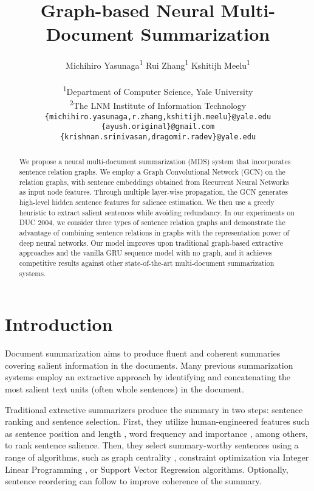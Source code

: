 \documentclass[11pt,a4paper]{article}
\title{Graph-based Neural Multi-Document Summarization}
\author{
	    Michihiro Yasunaga\textsuperscript{1} \quad Rui Zhang\textsuperscript{1} \quad Kshitijh Meelu\textsuperscript{1} \\ \quad {\bf Ayush Pareek\textsuperscript{2}} \quad {\bf Krishnan Srinivasan\textsuperscript{1}} \quad {\bf Dragomir Radev\textsuperscript{1}}\\
  	    \textsuperscript{1}Department of Computer Science, Yale University\\
  	    \textsuperscript{2}The LNM Institute of Information Technology\\
        {\small {\tt \{michihiro.yasunaga,r.zhang,kshitijh.meelu\}@yale.edu}}\\[-1mm]
        {\small{\tt \{ayush.original\}@gmail.com}}\\[-1mm]
        {\small{\tt \{krishnan.srinivasan,dragomir.radev\}@yale.edu}}
}
\date{}
\begin{document}
\setlength{\abovedisplayskip}{6pt}
\setlength{\belowdisplayskip}{5pt}
        
\maketitle
\begin{abstract}
We propose a neural multi-document summarization (MDS) system that incorporates sentence relation graphs.
We employ a Graph Convolutional Network (GCN) on the relation graphs, with sentence embeddings obtained from Recurrent Neural Networks as input node features.
Through multiple layer-wise propagation, the GCN generates high-level hidden sentence features for salience estimation.
We then use a greedy heuristic to extract salient sentences while avoiding redundancy.
In our experiments on DUC 2004, we consider three types of sentence relation graphs and demonstrate the advantage of combining sentence relations in graphs with the representation power of deep neural networks.
Our model improves upon traditional graph-based extractive approaches and the vanilla GRU sequence model with no graph, and it achieves competitive results against other state-of-the-art multi-document summarization systems.
\end{abstract}

\section{Introduction}
Document summarization aims to produce fluent and coherent summaries covering salient information in the documents.
Many previous summarization systems employ an extractive approach by identifying and concatenating the most salient text units (often whole sentences) in the document. 
  
Traditional extractive summarizers produce the summary in two steps: sentence ranking and sentence selection.
First, they utilize human-engineered features such as sentence position and length \cite{radev2004mead}, word frequency and importance \cite{nenkova2006compositional,hong2014improving}, among others, to rank sentence salience.
Then, they select summary-worthy sentences using a range of algorithms, such as graph centrality \cite{erkan2004lexrank}, constraint optimization via Integer Linear Programming \cite{mcdonald2007study,gillick2009scalable,li2013using}, or Support Vector Regression \cite{li2007multi} algorithms.
Optionally, sentence reordering \cite{lapata2003probabilistic,barzilay2001sentence} can follow to improve coherence of the summary.
\end{document}
